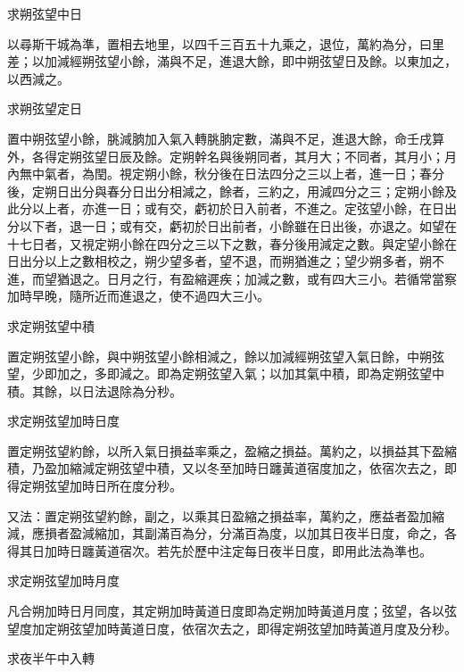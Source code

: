 \begin{pinyinscope}
 求朔弦望中日



 以尋斯干城為準，置相去地里，以四千三百五十九乘之，退位，萬約為分，曰里差；以加減經朔弦望小餘，滿與不足，進退大餘，即中朔弦望日及餘。以東加之，以西減之。



 求朔弦望定日



 置中朔弦望小餘，朓減朒加入氣入轉朓朒定數，滿與不足，進退大餘，命壬戌算外，各得定朔弦望日辰及餘。定朔幹名與後朔同者，其月大；不同者，其月小；月內無中氣者，為閏。視定朔小餘，秋分後在日法四分之三以上者，進一日；春分後，定朔日出分與春分日出分相減之，餘者，三約之，用減四分之三；定朔小餘及此分以上者，亦進一日；或有交，虧初於日入前者，不進之。定弦望小餘，在日出分以下者，退一日；或有交，虧初於日出前者，小餘雖在日出後，亦退之。如望在十七日者，又視定朔小餘在四分之三以下之數，春分後用減定之數。與定望小餘在日出分以上之數相校之，朔少望多者，望不退，而朔猶進之；望少朔多者，朔不進，而望猶退之。日月之行，有盈縮遲疾；加減之數，或有四大三小。若循常當察加時早晚，隨所近而進退之，使不過四大三小。



 求定朔弦望中積



 置定朔弦望小餘，與中朔弦望小餘相減之，餘以加減經朔弦望入氣日餘，中朔弦望，少即加之，多即減之。即為定朔弦望入氣；以加其氣中積，即為定朔弦望中積。其餘，以日法退除為分秒。



 求定朔弦望加時日度



 置定朔弦望約餘，以所入氣日損益率乘之，盈縮之損益。萬約之，以損益其下盈縮積，乃盈加縮減定朔弦望中積，又以冬至加時日躔黃道宿度加之，依宿次去之，即得定朔弦望加時日所在度分秒。



 又法：置定朔弦望約餘，副之，以乘其日盈縮之損益率，萬約之，應益者盈加縮減，應損者盈減縮加，其副滿百為分，分滿百為度，以加其日夜半日度，命之，各得其日加時日躔黃道宿次。若先於歷中注定每日夜半日度，即用此法為準也。



 求定朔弦望加時月度



 凡合朔加時日月同度，其定朔加時黃道日度即為定朔加時黃道月度；弦望，各以弦望度加定朔弦望加時黃道日度，依宿次去之，即得定朔弦望加時黃道月度及分秒。



 求夜半午中入轉




\end{pinyinscope}
